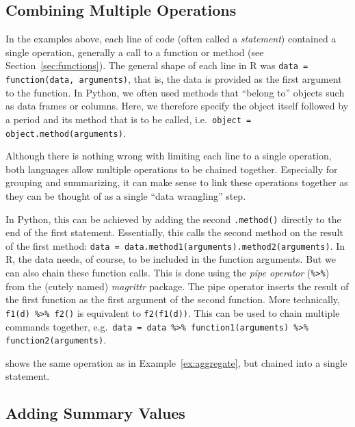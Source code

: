\subsection{Combining Multiple Operations}\label{sec:combining}

In the examples above, each line of code (often called a \emph{statement}) contained a single operation, generally a call to a function or method (see Section~\ref{sec:functions}).
The general shape of each line in R was \verb+data = function(data, arguments)+, that is, the data is provided as the first argument to the function.
In Python, we often used methods that ``belong to'' objects such as data frames or columns. Here, we therefore specify the object itself followed by a period and its method that is to be called,
i.e.\ \verb+object = object.method(arguments)+.

Although there is nothing wrong with limiting each line to a single operation, both languages allow multiple operations to be chained together.
Especially for grouping and summarizing, it can make sense to link these operations together as they can be thought of as a single ``data wrangling'' step.

In Python, this can be achieved by adding the second \verb+.method()+ directly to the end of the first statement.
Essentially, this calls the second method on the result of the first method: \verb+data = data.method1(arguments).method2(arguments)+.
In R, the data needs, of course, to be included in the function arguments. But we can also chain these function calls.
This is done using the \emph{pipe operator} (\verb+%>%+) from the (cutely named) \emph{magrittr} package.
The pipe operator inserts the result of the first function as the first argument of the second function.
More technically, \verb|f1(d) %>% f2()| is equivalent to \verb|f2(f1(d))|.
This can be used to chain multiple commands together, e.g.\ \verb+data = data %>% function1(arguments) %>% function2(arguments)+.


 shows the same operation as in Example~\ref{ex:aggregate}, but chained into a single statement.


\subsection{Adding Summary Values}\label{sec:summarizing}

